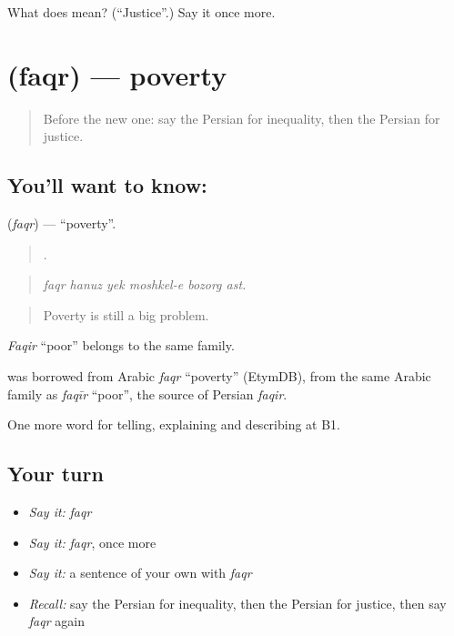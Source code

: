 \begin{tcolorbox}[breakable,colback=teal!4,colframe=teal!35!black,title={Before you move on}]
What does  mean? (\textquotedblleft{}Justice\textquotedblright{}.) Say it once more.
\end{tcolorbox}
\section[\texorpdfstring{\fa{فقر} (faqr)}{فقر (faqr)}]{ (faqr) — poverty}

\label{lesson:FA-C386-faqr}



\begin{quote}
Before the new one: say the Persian for inequality, then the Persian for justice.
\end{quote}

\subsection*{You'll want to know: }
\textbf{} (\emph{faqr}) — \textquotedblleft{}poverty\textquotedblright{}.

\begin{quote}
     .
\end{quote}

\begin{quote}
\emph{faqr hanuz yek moshkel-e bozorg ast.}
\end{quote}

\begin{quote}
Poverty is still a big problem.
\end{quote}

\emph{Faqir} \textquotedblleft{}poor\textquotedblright{} belongs to the same family.

\begin{cousinweb}
\textbf{} was borrowed from Arabic \emph{faqr} \textquotedblleft{}poverty\textquotedblright{} (EtymDB), from the same Arabic family as \emph{faqīr} \textquotedblleft{}poor\textquotedblright{}, the source of Persian \emph{faqir}.
\end{cousinweb}

\begin{grammarlens}[title={What you've built}]
One more word for telling, explaining and describing at B1.
\end{grammarlens}

\subsection*{Your turn}
\begin{itemize}
\raggedright
  \item \emph{Say it:} \emph{faqr}
  \item \emph{Say it:} \emph{faqr}, once more
  \item \emph{Say it:} a sentence of your own with \emph{faqr}
  \item \emph{Recall:} say the Persian for inequality, then the Persian for justice, then say \emph{faqr} again
\end{itemize}

